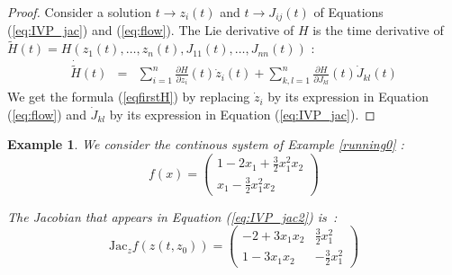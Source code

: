 \documentclass{sig-alternate-05-2015} %
\newcommand\ForAuthors[1]%
 {\par\smallskip                     %
  \begin{center}%
   \fbox%
   {\parbox{0.9\linewidth}%
    {\raggedright\sc--- #1}%
   }%
  \end{center}%
  \par\smallskip                     %
 }
\newtheorem{example}{Example}
\begin{document}
\begin{proof}
Consider a solution $t \rightarrow z_i(t)$ and $t \rightarrow J_{ij}(t)$ of
Equations (\ref{eq:IVP_jac}) and (\ref{eq:flow}). The Lie derivative of $H$
is
the time derivative of $\tilde{H}(t)=H(z_1(t),\ldots,z_n(t),J_{11}(t),\ldots,J_{nn}(t))$ : 
$$\begin{array}{rcl}
\dot{\tilde{H}}(t) & = & \sum\limits_{i=1}^{n} \frac{\partial H}{\partial z_i}(t)
\dot{z}_i(t)+\sum\limits_{k,l=1}^n \frac{\partial H}{\partial J_{kl}}(t) \dot{J}_{kl}(t)
\end{array}$$
We get the formula (\ref{eqfirstH}) by 
replacing $\dot{z}_i$ by its expression in Equation (\ref{eq:flow}) and
$\dot{J}_{kl}$ by its expression in Equation (\ref{eq:IVP_jac}). 
\end{proof}

\begin{example}
\label{running1}
We consider the continous system of Example \ref{running0} : 
$$ f(x) = \left(\begin{array}{l}
1-2 x_1+\frac{3}{2} x_1^2 x_2 \\
x_1-\frac{3}{2} x_1^2x_2
\end{array}\right)$$

The Jacobian that appears in Equation (\ref{eq:IVP_jac2}) is~: 
$$
\mbox{Jac}_z f(z(t,z_0)) = \left(\begin{array}{cc} 
-2+3x_1x_2  & \frac{3}{2} x^2_1 \\
1-3x_1x_2 & -\frac{3}{2} x^2_1
\end{array}\right)
$$
\end{example}
\end{document}

